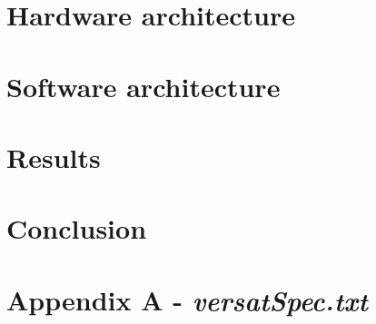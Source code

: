 \documentclass[10pt]{esda}
\begin{document}
\cleardoublepage
\section{Hardware architecture}
\label{sec:hw}


\cleardoublepage
\section{Software architecture}
\label{sec:sw}


\cleardoublepage
\section{Results}
\label{sec:results}


\cleardoublepage
\section{Conclusion}
\label{sec:conc}


\cleardoublepage
{}




\cleardoublepage

\section*{Appendix A - \textbf{\textit{versatSpec.txt}}}
\appendix

\end{document}
